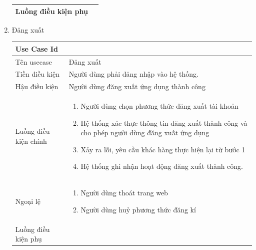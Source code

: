 \begin{enumerate}
\begin{center}{\color{black}}
\begin{tabular}{|p{5cm}|p{7cm}|}
        Luồng điều kiện phụ & \\ \hline
      
    \end{tabular}
\end{center}
\newpage
\item Đăng xuất
\begin{center}{\color{black}}

    \begin{tabular}{|p{5cm}|p{7cm}|} \hline
    
        \textbf{Use Case Id} & \textbf{}  \\ \hline
        Tên usecase &  Đăng xuất\\ \hline
        Tiền điều kiện & Người dùng phải đăng nhập vào hệ thống. \\ \hline
        
        Hậu điều kiện &  Người dùng đăng xuất ứng dụng thành công\\ \hline
        Luồng điều kiện chính &  
            \begin{enumerate}[1.]
                \item Người dùng chọn phương thức đăng xuất tài khoản
                \item Hệ thống xác thực thông tin đăng xuất thành công và cho phép người dùng đăng xuất ứng dụng
                \item Xảy ra lỗi, yêu cầu khác hàng thực hiện lại từ bước 1
                \item Hệ thống ghi nhận hoạt động đăng xuất thành công.
            \end{enumerate}\\
        \hline
        Ngoại lệ &
            \begin{enumerate}[1.]                
                \item  Người dùng thoát trang web
                \item Người dùng huỷ phương thức đăng kí
            \end{enumerate}\\ \hline
        
        Luồng điều kiện phụ & \\ \hline
      
    \end{tabular}

\end{center}
\end{enumerate}